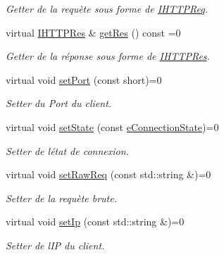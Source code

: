 \begin{DoxyCompactItemize}
\begin{DoxyCompactList}\small\item\em Getter de la requète sous forme de \hyperlink{class_a_p_i_tree_friends_1_1_i_h_t_t_p_req}{I\+H\+T\+T\+P\+Req}. \end{DoxyCompactList}\item 
virtual \hyperlink{class_a_p_i_tree_friends_1_1_i_h_t_t_p_res}{I\+H\+T\+T\+P\+Res} \& \hyperlink{class_a_p_i_tree_friends_1_1_i_connection_ae8fe73681087ea566a866916f3a8ef6f}{get\+Res} () const =0
\begin{DoxyCompactList}\small\item\em Getter de la réponse sous forme de \hyperlink{class_a_p_i_tree_friends_1_1_i_h_t_t_p_res}{I\+H\+T\+T\+P\+Res}. \end{DoxyCompactList}\item 
virtual void \hyperlink{class_a_p_i_tree_friends_1_1_i_connection_ab2e4c4d259cc43e4ac5a610a15be38c0}{set\+Port} (const short)=0
\begin{DoxyCompactList}\small\item\em Setter du Port du client. \end{DoxyCompactList}\item 
virtual void \hyperlink{class_a_p_i_tree_friends_1_1_i_connection_ac6fa604244d43e6550449d54a08c9727}{set\+State} (const \hyperlink{namespace_a_p_i_tree_friends_a746fed077303e8587bfa0e8f2dbf4997}{e\+Connection\+State})=0
\begin{DoxyCompactList}\small\item\em Setter de l\textquotesingle{}état de connexion. \end{DoxyCompactList}\item 
virtual void \hyperlink{class_a_p_i_tree_friends_1_1_i_connection_a55f642d33ed7245bbee77f602049221b}{set\+Raw\+Req} (const std\+::string \&)=0
\begin{DoxyCompactList}\small\item\em Setter de la requète brute. \end{DoxyCompactList}\item 
virtual void \hyperlink{class_a_p_i_tree_friends_1_1_i_connection_aea188cff810b445690e36047a4ea7b65}{set\+Ip} (const std\+::string \&)=0
\begin{DoxyCompactList}\small\item\em Setter de l\textquotesingle{}I\+P du client. \end{DoxyCompactList}\end{DoxyCompactItemize}


